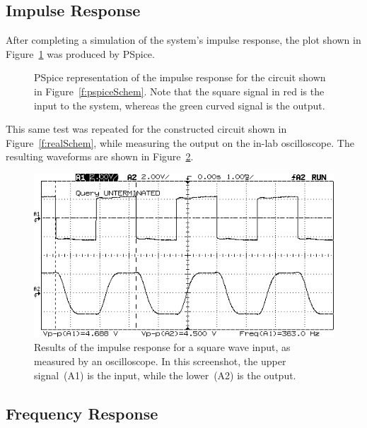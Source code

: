 \subsection{Impulse Response}
After completing a simulation of the system's impulse response, the plot shown
in Figure~\ref{f:impulseSim} was produced by PSpice.
%
\begin{figure}[H]
	\centering
	
	\parbox{.6\textwidth}{
	\caption[Simulated Impulse Response]{PSpice representation of the impulse
	response for the circuit shown in Figure~\ref{f:pspiceSchem}.  Note that
	the square signal in red is the input to the system, whereas the green
	curved signal is the output.}
	\label{f:impulseSim}}
\end{figure}
%
This same test was repeated for the constructed circuit shown in
Figure~\ref{f:realSchem}, while measuring the output on the in-lab
oscilloscope.  The resulting waveforms are shown in Figure~\ref{f:impulseReal}.
%
\begin{figure}[H]
	\centering
	\includegraphics[width=.8\textwidth]{img/shot/squareWaveShot.png}
	\parbox{.6\textwidth}{
	\caption[Measured Impulse Response]{Results of the impulse response for a
	square wave input, as measured by an oscilloscope.  In this screenshot, the
	upper signal~(A1) is the input, while the lower~(A2) is the output.}
	\label{f:impulseReal}}
\end{figure}

\subsection{Frequency Response}
\begin{figure}[H]
	\centering
	
\end{figure}

\begin{figure}[H]
	\centering
	
\end{figure}

\begin{figure}[H]
	\centering
	
\end{figure}

\begin{figure}[H]
	\centering
	
\end{figure}

